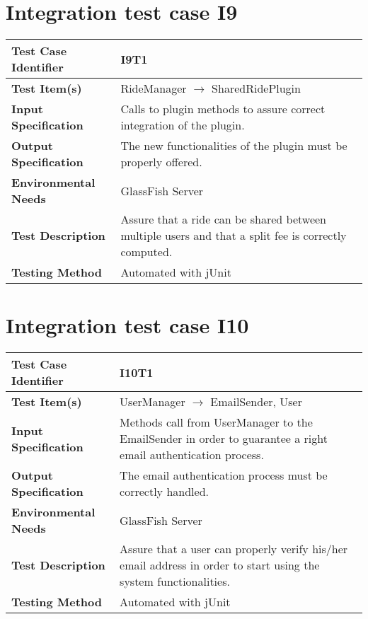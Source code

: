 \vspace{2em}

\section{Integration test case I9}

\begin{tabular}{l p{}}
    \hline
    \textbf{Test Case Identifier} & I9T1\\
    \hline
    \textbf{Test Item(s)} & RideManager $\rightarrow$ SharedRidePlugin\\
    \hline
    \textbf{Input Specification} & Calls to plugin methods to assure correct integration of the plugin.\\
    \hline
    \textbf{Output Specification} & The new functionalities of the plugin must be properly offered.\\
    \hline
    \textbf{Environmental Needs} & GlassFish Server\\
    \hline
    \textbf{Test Description} & Assure that a ride can be shared between multiple users and that a split fee is correctly computed.\\
    \hline
    \textbf{Testing Method} & Automated with jUnit \\
    \hline
\end{tabular}

\vspace{2em}

\section{Integration test case I10}

\begin{tabular}{l p{}}
    \hline
    \textbf{Test Case Identifier} & I10T1\\
    \hline
    \textbf{Test Item(s)} & UserManager $\rightarrow$ EmailSender, User \\
    \hline
    \textbf{Input Specification} & Methods call from UserManager to the EmailSender in order to guarantee a right email authentication process.\\
    \hline
    \textbf{Output Specification} & The email authentication process must be correctly handled.\\
    \hline
    \textbf{Environmental Needs} & GlassFish Server\\
    \hline
    \textbf{Test Description} & Assure that a user can properly verify his/her email address in order to start using the system functionalities.\\
    \hline
    \textbf{Testing Method} & Automated with jUnit \\
    \hline
\end{tabular}

